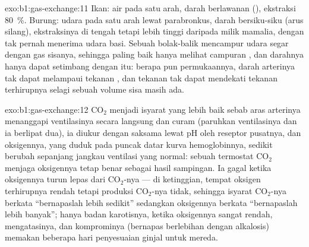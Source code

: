 \begin{solution}{exo:b1:gas-exchange:11}
Ikan: air pada satu arah, darah berlawanan (), ekstraksi
\qty{80}{\%}. Burung: udara pada satu arah lewat parabronkus, darah
bersiku-siku (arus silang), ekstraksinya di tengah tetapi lebih tinggi
daripada milik mamalia, dengan  tak pernah
menerima udara basi. Sebuah  bolak-balik mencampur udara
segar dengan gas sisanya, sehingga  paling baik
hanya melihat campuran , dan darahnya hanya dapat setimbang
dengan itu: berapa pun permukaannya, darah arterinya tak dapat
melampaui tekanan , dan tekanan  tak dapat
mendekati tekanan terhirupnya selagi sebuah volume sisa masih ada.
\end{solution}

\begin{solution}{exo:b1:gas-exchange:12}
$\mathrm{CO_2}$ menjadi isyarat yang lebih baik sebab aras arterinya
menanggapi ventilasinya secara langsung dan curam (paruhkan
ventilasinya dan ia berlipat dua), ia diukur dengan saksama lewat pH
oleh reseptor pusatnya, dan oksigennya, yang duduk pada puncak datar
kurva hemoglobinnya, sedikit berubah sepanjang jangkau ventilasi yang
normal: sebuah termostat $\mathrm{CO_2}$ menjaga oksigennya tetap benar
sebagai hasil sampingan. Ia gagal ketika oksigennya turun lepas dari
$\mathrm{CO_2}$-nya --- di ketinggian, tempat oksigen terhirupnya
rendah tetapi produksi $\mathrm{CO_2}$-nya tidak, sehingga isyarat
$\mathrm{CO_2}$-nya berkata ``bernapaslah lebih sedikit'' sedangkan
oksigennya berkata ``bernapaslah lebih banyak''; hanya badan
karotisnya, ketika oksigennya sangat rendah, mengatasinya, dan
komprominya (bernapas berlebihan dengan alkalosis) memakan beberapa
hari penyesuaian ginjal untuk mereda.
\end{solution}

